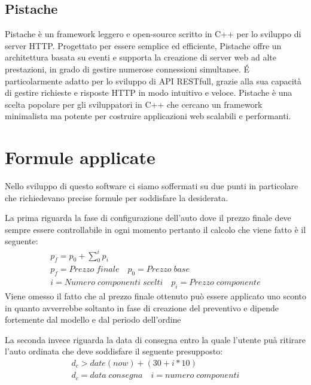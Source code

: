 \documentclass[a4paper, 11pt,oneside,]{book}
\newcommand{\spacing}{\par\bigskip\noindent}
\begin{document}
        \subsection{Pistache}
            Pistache è un framework leggero e open-source scritto in C++ per lo sviluppo di server HTTP. Progettato per essere semplice ed efficiente, Pistache offre un architettura basata su eventi e supporta la creazione di server web ad alte prestazioni,
            in grado di gestire numerose connessioni simultanee. \'E particolarmente adatto per lo sviluppo di API RESTfull, grazie alla sua capacità di gestire richieste e risposte HTTP in modo intuitivo e veloce. Pistache è una scelta popolare per gli sviluppatori 
            in C++ che cercano un framework minimalista ma potente per costruire applicazioni web scalabili e performanti.
    \section{Formule applicate}
        Nello sviluppo di questo software ci siamo soffermati su due punti in particolare che richiedevano precise formule per soddisfare la desiderata.
        \spacing
        La prima riguarda la fase di configurazione dell'auto dove il prezzo finale deve sempre essere controllabile in ogni momento pertanto il calcolo che viene fatto è il seguente:
        \begin{gather*}
            p_{f} = p_{0} + {\sum_{0}^{i}} p_{i} \\
            p_{f} = Prezzo \; finale \quad p_{0} = Prezzo \; base \\
            i = Numero \; componenti \; scelti \quad p_{i} = Prezzo \; componente
        \end{gather*}
        Viene omesso il fatto che al prezzo finale ottenuto può essere applicato uno sconto in quanto avverrebbe soltanto in fase di creazione del preventivo e dipende fortemente dal modello e dal periodo dell'ordine
        \spacing
        La seconda invece riguarda la data di consegna entro la quale l'utente puà ritirare l'auto ordinata che deve soddisfare il seguente presupposto:
        \begin{gather*}
            d_{c} > date(now)+(30 + i*10) \\
            d_{c} = data \; consegna \quad i = numero \; componenti
        \end{gather*}
    

            
        
\end{document}
